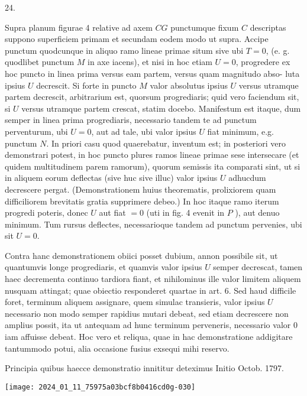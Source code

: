 \documentclass[10pt]{article}
\begin{document}
24.

Supra planum figurae 4 relative ad axem \(C G\) punctumque fixum \(C\) descriptas suppono superficiem primam et secundam eodem modo ut supra. Accipe punctum quodcunque in aliquo ramo lineae primae situm sive ubi \(T=0\), (e. g. quodlibet punctum \(M\) in axe iacens), et nisi in hoc etiam \(U=0\), progredere ex hoc puncto in linea prima versus eam partem, versus quam magnitudo abso-
luta ipsius \(U\) decrescit. Si forte in puncto \(M\) valor absolutus ipsius \(U\) versus utramque partem decrescit, arbitrarium est, quorsum progrediaris; quid vero faciendum sit, si \(U\) versus utramque partem crescat, statim docebo. Manifestum est itaque, dum semper in linea prima progrediaris, necessario tandem te ad punctum perventurum, ubi \(U=0\), aut ad tale, ubi valor ipsius \(U\) fiat minimum, e.g. punctum \(N\). In priori casu quod quaerebatur, inventum est; in posteriori vero demonstrari potest, in hoc puncto plures ramos lineae primae sese intersecare (et quidem multitudinem parem ramorum), quorum semissis ita comparati sint, ut si in aliquem eorum deflectas (sive huc sive illuc) valor ipsius \(U\) adhucdum decrescere pergat. (Demonstrationem huius theorematis, prolixiorem quam difficiliorem brevitatis gratia supprimere debeo.) In hoc itaque ramo iterum progredi poteris, donec \(U\) aut fiat \(=0\) (uti in fig. 4 evenit in \(P\) ), aut denuo minimum. Tum rursus deflectes, necessarioque tandem ad punctum pervenies, ubi sit \(U=0\).

Contra hanc demonstrationem obiici posset dubium, annon possibile sit, ut quantumvis longe progrediaris, et quamvis valor ipsius \(U\) semper decrescat, tamen haec decrementa continuo tardiora fiant, et nihilominus ille valor limitem aliquem nusquam attingat; quae obiectio responderet quartae in art. 6. Sed haud difficile foret, terminum aliquem assignare, quem simulac transieris, valor ipsius \(U\) necessario non modo semper rapidius mutari debeat, sed etiam decrescere non amplius possit, ita ut antequam ad hunc terminum perveneris, necessario valor 0 iam affuisse debeat. Hoc vero et reliqua, quae in hac demonstratione addigitare tantummodo potui, alia occasione fusius exsequi mihi reservo.

Principia quibus haecce demonstratio innititur deteximus Initio Octob. 1797.

\begin{center}
\texttt{[image: 2024\_01\_11\_75975a03bcf8b0416cd0g-030]}
\end{center}
\end{document}
